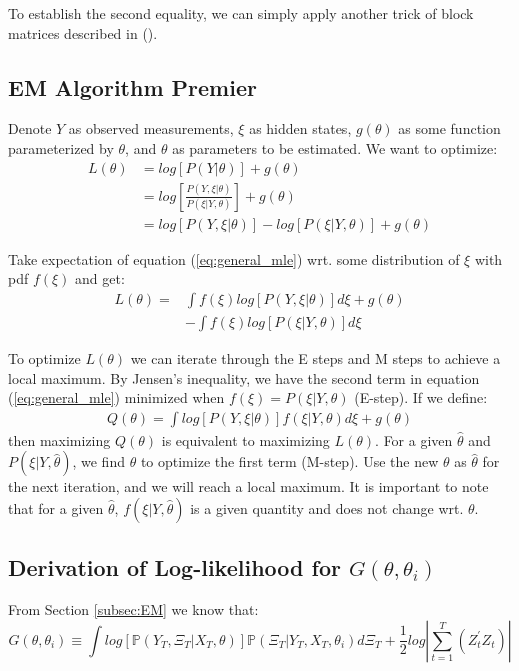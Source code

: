 \documentclass[10pt, titlepage]{article}
\numberwithin{equation}{section}
\begin{document}
To establish the second equality, we can simply apply another trick of block matrices described in (\cite{petersen2008matrix}).

\subsection{EM Algorithm Premier} \label{ap:EM_proof}
Denote $Y$ as observed measurements, $\xi$ as hidden states, $g(\theta)$ as some function parameterized by $\theta$, and $\theta$ as parameters to be estimated. We want to optimize:
\begin{align}
    L(\theta) & = log[P(Y|\theta)] + g(\theta) \nonumber \\
    & = log\left[\frac{P(Y,\xi|\theta)}{P(\xi|Y,\theta)}\right] +g(\theta) \nonumber \\
    & = log[P(Y,\xi|\theta)] - log[P(\xi|Y,\theta)] +g(\theta) \label{eq:general_mle}
\end{align}

Take expectation of equation (\ref{eq:general_mle}) wrt. some distribution of $\xi$ with pdf $f(\xi)$ and get:
\begin{align}
    L(\theta) = & \int f(\xi)log[P(Y,\xi|\theta)]d\xi + g(\theta) \nonumber \\
    & - \int f(\xi)log[P(\xi|Y,\theta)]d\xi \nonumber
\end{align}

To optimize $L(\theta)$ we can iterate through the E steps and M steps to achieve a local maximum. By Jensen's inequality, we have the second term in equation (\ref{eq:general_mle}) minimized when $f(\xi)=P(\xi|Y,\theta)$ (E-step). If we define:
\begin{align}
    Q(\theta) = \int log[P(Y,\xi|\theta)]f(\xi|Y,\theta)d\xi + g(\theta) \label{eq:Q}
\end{align}
then maximizing $Q(\theta)$ is equivalent to maximizing $ L(\theta)$. For a given $\hat{\theta}$ and $P(\xi|Y, \hat{\theta})$, we find $\theta$ to optimize the first term (M-step). Use the new $\theta$ as $\hat{\theta}$ for the next iteration, and we will reach a local maximum. It is important to note that for a given $\hat{\theta}$, $f(\xi|Y, \hat{\theta})$ is a given quantity and does not change wrt. $\theta$. 

\subsection{Derivation of Log-likelihood for \texorpdfstring{$G(\theta,\theta_i)$}{}} \label{ap:log}
From Section \ref{subsec:EM} we know that:
\[
    G(\theta,\theta_i) \equiv \int log[\mathbb{P}(Y_T,\Xi_T|X_T,\theta)]\mathbb{P}(\Xi_T|Y_T,X_T,\theta_i)d\Xi_T + \frac{1}{2}log\left|\sum_{t=1}^{T}(Z_t^{'}Z_t)\right| 
\]
\end{document}
